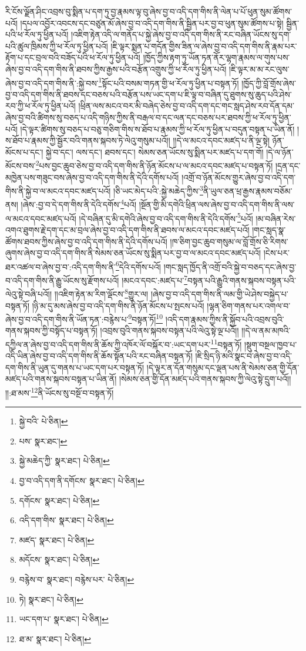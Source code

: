 རི་ངོས་ལྗོན་ཤིང་འབྲས་བུ་སྨིན་པ་དག་ཏུ་བྱ་རྣམས་ལྟ་བུ་ཞེས་བྱ་བ་འདི་དག་གིས་ནི་ལེན་པ་པོ་ཕུན་སུམ་ཚོགས་པའོ། །དཔལ་འབྱོར་འབངས་དང་བཙུན་མོ་ཞེས་བྱ་བ་འདི་དག་གིས་ནི་སྦྱིན་པར་བྱ་བ་ཕུན་སུམ་ཚོགས་པ་སྟེ། སྦྱིན་པའི་ཕ་རོལ་ཏུ་ཕྱིན་པའོ། །འཇིག་རྟེན་འདི་ལ་གནོད་པ་སྐྱེ་ཞེས་བྱ་བ་འདི་དག་གིས་ནི་རང་བཞིན་ཡོངས་སུ་དག་པའི་ཚུལ་ཁྲིམས་ཀྱི་ཕ་རོལ་ཏུ་ཕྱིན་པའོ། །ཇི་ལྟར་སྨན་པ་གདོན་གྱིས་ཟིན་ལ་ཞེས་བྱ་བ་འདི་དག་གིས་ནི་རྣམ་པར་རྟོག་པ་དང་བྲལ་བའི་བཟོད་པའི་ཕ་རོལ་ཏུ་ཕྱིན་པའོ། །ཁྱོད་ཀྱིས་རྟག་ཏུ་ཡོན་ཏན་ནོར་ལྷག་རྣམས་ལ་གུས་པས་ཞེས་བྱ་བ་འདི་དག་གིས་ནི་ཐབས་ཀྱིས་རྒྱས་པའི་བརྩོན་འགྲུས་ཀྱི་ཕ་རོལ་ཏུ་ཕྱིན་པའོ། །ཇི་ལྟར་མ་མ་རང་ལུས་ཞེས་བྱ་བ་འདི་དག་གིས་ནི་:སྐྱེ་བས་\footnote{སྐྱེ་བའི་  པེ་ཅིན། }སྟོང་པའི་བསམ་གཏན་གྱི་ཕ་རོལ་ཏུ་ཕྱིན་པ་བསྟན་ཏོ། །ཁྱོད་ཀྱི་བློ་གྲོས་ཞེས་བྱ་བ་འདི་དག་གིས་ནི་ཐབས་དང་བཅས་པའི་བརྩོན་པས་ཡང་དག་པ་ཇི་ལྟ་བ་བཞིན་དུ་ཐུགས་སུ་ཆུད་པའི་ཤེས་རབ་ཀྱི་ཕ་རོལ་ཏུ་ཕྱིན་པའོ། །ཕྲིན་ལས་མངའ་བར་མི་བཞེད་ཅེས་བྱ་བ་འདི་དག་དང་གང་སླད་ཤེས་རབ་དོན་དམ་ཞེས་བྱ་བའི་ཚིགས་སུ་བཅད་པ་འདི་གཉིས་ཀྱིས་ནི་བརྒལ་བ་དང་ལན་དང་བཅས་པར་ཐབས་ཀྱི་ཕ་རོལ་ཏུ་ཕྱིན་པའོ། །དེ་ལྟར་ཚིགས་སུ་བཅད་པ་བཅུ་གཅིག་གིས་ས་ཐོབ་པ་རྣམས་ཀྱི་ཕ་རོལ་ཏུ་ཕྱིན་པ་བདུན་བསྟན་པ་ཡིན་ནོ། །ས་ཐོབ་པ་རྣམས་ཀྱི་སྦྱོར་བའི་གནས་སྐབས་ཏེ་ལེའུ་གསུམ་པའོ།། །།དེ་ལ་མངའ་དབང་མཛད་པ་ནི་ལྔ་སྟེ། ཉོན་མོངས་པ་དང་། སྐྱེ་བ་དང་། ལས་དང་། ཐབས་དང་། སེམས་ཅན་ཡོངས་སུ་སྨིན་པར་མཛད་པ་དག་གོ། །དེ་ལ་ཉོན་མོངས་བས་\footnote{པས་  སྣར་ཐང་། }པས་བྱང་ཆུབ་ཅེས་བྱ་བ་འདི་དག་གིས་ནི་ཉོན་མོངས་པ་ལ་མངའ་དབང་མཛད་པ་བསྟན་ཏོ། །དྲན་དང་མཁྱེན་པས་གཟུང་བས་ཞེས་བྱ་བ་འདི་དག་གིས་ནི་དེའི་དགོས་པའོ། །འགྲོ་བ་ཉོན་མོངས་གྱུར་ཞེས་བྱ་བ་འདི་དག་གིས་ནི་སྐྱེ་བ་ལ་མངའ་དབང་མཛད་པའོ། །ཅི་ཡང་མེད་པའི་:སྐྱེ་མཆེད་ཀྱིས་\footnote{སྐྱེ་མཆེད་ཀྱི་  སྣར་ཐང་།  པེ་ཅིན། }ནི་ཡུལ་ཅན་ཕྲ་རྒྱས་རྣམས་བཅོམ་ནས། །ཞེས་:བྱ་བ་དེ་དག་གིས་ནི་དེའི་དགོས་\footnote{བྱ་བ་འདི་དག་ནི་དགོངས་  སྣར་ཐང་།  པེ་ཅིན། }པའོ། །སྔོན་གྱི་མི་དགེའི་ཕྲིན་ལས་ཞེས་བྱ་བ་འདི་དག་གིས་ནི་ལས་ལ་མངའ་དབང་མཛད་པའོ། །དེ་བཞིན་དུ་མི་དགེའི་ཞེས་བྱ་བ་འདི་དག་གིས་ནི་དེའི་དགོས་\footnote{དགོངས་  སྣར་ཐང་།  པེ་ཅིན། }པའོ། །མ་བཞིན་རེས་འགའ་ཐུགས་རྗེ་དག་དང་མ་བྲལ་ཞེས་བྱ་བ་འདི་དག་གིས་ནི་ཐབས་ལ་མངའ་དབང་མཛད་པའོ། །གང་སླད་སྣ་ཚོགས་ཐབས་ཀྱིས་ཞེས་བྱ་བ་འདི་དག་གིས་ནི་དེའི་དགོས་པའོ། །ཁ་ཅིག་བྱང་ཆུབ་གསུམ་ལ་བློ་གྲོས་ཅི་རིགས་ཞུགས་ཞེས་བྱ་བ་འདི་དག་གིས་ནི་སེམས་ཅན་ཡོངས་སུ་སྨིན་པར་བྱ་བ་ལ་མངའ་དབང་མཛད་པའོ། །ངེས་པར་ཐར་འཚལ་བ་ཞེས་བྱ་བ་:འདི་དག་གིས་ནི་\footnote{འདི་དག་གིས་  སྣར་ཐང་།  པེ་ཅིན། }དེའི་དགོས་པའོ། །གང་སླད་ཁྱོད་ནི་འགྲོ་བའི་སྐྱེ་བ་བཅད་དང་ཞེས་བྱ་བ་འདི་དག་གིས་ནི་རྒྱུ་ཡོངས་སུ་རྫོགས་པའོ། །མངའ་དབང་:མཛད་པ་\footnote{མཛད་  སྣར་ཐང་།  པེ་ཅིན། }བསྟན་པའི་རྒྱུའི་གནས་སྐབས་བསྟན་པའི་ལེའུ་སྟེ་བཞི་པའོ།། །།འཇིག་རྟེན་མ་རིག་ལྡོངས་\footnote{མདོངས་  སྣར་ཐང་།  པེ་ཅིན། }གྱུར་ལ། །ཞེས་བྱ་བ་འདི་དག་གིས་ནི་ལམ་གྱི་ཡེ་ཤེས་བསྐྱེད་པ་བསྟན་ཏོ། །ཉི་མ་དུ་མས་ཞེས་བྱ་བ་འདི་དག་གིས་ནི་ཉོན་མོངས་པ་སྤངས་པའོ། །ལྷན་ཅིག་གནས་པར་འགལ་བ་ཞེས་བྱ་བ་འདི་དག་གིས་ནི་ཡོན་ཏན་:བརྙེས་པ་\footnote{བརྙེས་བ་  སྣར་ཐང་། བརྙེས་པར་  པེ་ཅིན། }བསྟན་ཏོ།\footnote{ཏེ།  སྣར་ཐང་།  པེ་ཅིན། } །འདི་དག་རྣམས་ཀྱིས་ནི་སྐྱོབ་པའི་འབྲས་བུའི་གནས་སྐབས་ཀྱི་བསྟོད་པ་བསྟན་ཏོ། །འབྲས་བུའི་གནས་སྐབས་བསྟན་པའི་ལེའུ་སྟེ་ལྔ་པའོ།། །།དེ་ལ་ནམ་མཁའི་དཀྱིལ་ན་ཞེས་བྱ་བ་འདི་དག་གིས་ནི་ཆོས་ཀྱི་འཁོར་ལོ་བསྐོར་བ་:ཡང་དག་པར་\footnote{ཡང་དག་པ་  སྣར་ཐང་།  པེ་ཅིན། }བསྟན་ཏོ། །སྡུག་བསྔལ་ཁྱབ་པ་འདི་ཡིན་ཞེས་བྱ་བ་འདི་དག་གིས་ནི་ཆོས་སྟོན་པའི་རང་བཞིན་བསྟན་ཏོ། །ཇི་སྲིད་ཉི་མའི་སྣང་བ་ཞེས་བྱ་བ་འདི་དག་གིས་ནི་ཡུན་དུ་གནས་པ་ཡང་དག་པར་བསྟན་ཏོ། །དེ་ལྟར་ན་དོན་གསུམ་དང་ལྡན་པས་ནི་སེམས་ཅན་གྱི་དོན་མཛད་པའི་གནས་སྐབས་བསྟན་པ་ཡིན་ནོ། །སེམས་ཅན་གྱི་དོན་མཛད་པའི་གནས་སྐབས་ཀྱི་ལེའུ་སྟེ་དྲུག་པའོ།། །།:ཐ་མས་\footnote{ཐ་མ་  སྣར་ཐང་།  པེ་ཅིན། }ནི་ཡོངས་སུ་བསྔོ་བ་བསྟན་ཏོ། 